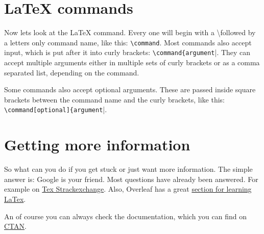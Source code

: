 \documentclass[
        faculty=1,
        paper=a4,
        fontsize=11pt,
        fontfamily=sans-serif,
        language=english,
        parskip=half+,
        linespacing=single,
        twoside=true,
        todos=off,
        draft=false,
    ]{HsH-report}
\begin{document}
    \section{LaTeX commands}
        Now lets look at the LaTeX command. Every one will begin with a \textbackslash\space followed by a letters only command name, like this:
        \verb|\command|. Most commands also accept input, which is put after it into curly brackets: \verb|\command{argument||. They can
        accept multiple arguments either in multiple sets of curly brackets or as a comma separated list, depending on the command.

        Some commands also accept optional arguments. These are passed inside square brackets between the command name and the curly brackets, like
        this: \verb|\command[optional]{argument||.

    \section{Getting more information}
        So what can you do if you get stuck or just want more information. The simple answer is: Google is your friend. Most questions have already
        been answered. For example on \href{https://tex.stackexchange.com/}{Tex Strackexchange}. Also, Overleaf has a great
        \href{https://www.overleaf.com/learn}{section for learning LaTex}.

        An of course you can always check the documentation, which you can find on \href{https://ctan.org/}{CTAN}.



\noindent\begin{minipage}{\textwidth} %
    \listoffigures
    \listoftables
\end{minipage}
\end{document}
